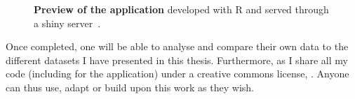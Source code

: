 \begin{figure}[!ht]
    \centering
    \vspace{-2mm}
    \caption[Application preview]{\label{fig:demoApp}\textbf{Preview of the
    application} developed with \textsf{R}
    and served through a shiny server~.}
\end{figure}
Once completed, one will be able to analyse and compare their own data
to the different datasets I have presented in this thesis.
Furthermore, as I share all my code (including for the application)
under a creative commons license,
.
Anyone can thus use, adapt or build upon this work as they wish.\mybr\


%
%
%
%
%
%
%


